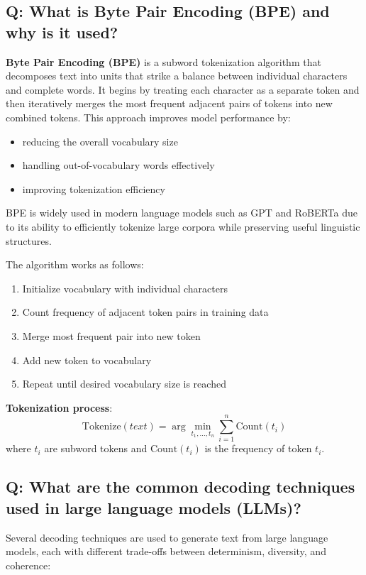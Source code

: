 \subsection*{Q: What is Byte Pair Encoding (BPE) and why is it used?}
\textbf{Byte Pair Encoding (BPE)} is a subword tokenization algorithm that decomposes text into units that strike a balance between individual characters and complete words. It begins by treating each character as a separate token and then iteratively merges the most frequent adjacent pairs of tokens into new combined tokens. This approach improves model performance by:
\begin{itemize}
	\item reducing the overall vocabulary size
	\item handling out-of-vocabulary words effectively
	\item improving tokenization efficiency
\end{itemize}

BPE is widely used in modern language models such as GPT and RoBERTa due to its ability to efficiently tokenize large corpora while preserving useful linguistic structures.

The algorithm works as follows:
\begin{enumerate}
	\item Initialize vocabulary with individual characters
	\item Count frequency of adjacent token pairs in training data
	\item Merge most frequent pair into new token
	\item Add new token to vocabulary
	\item Repeat until desired vocabulary size is reached
\end{enumerate}

\textbf{Tokenization process}:
\[
\text{Tokenize}(text) = \arg\min_{t_1, \ldots, t_n} \sum_{i=1}^{n} \text{Count}(t_i)
\]
where \(t_i\) are subword tokens and \(\text{Count}(t_i)\) is the frequency of token \(t_i\).

\subsection*{Q: What are the common decoding techniques used in large language models (LLMs)?}
Several decoding techniques are used to generate text from large language models, each with different trade-offs between determinism, diversity, and coherence:

